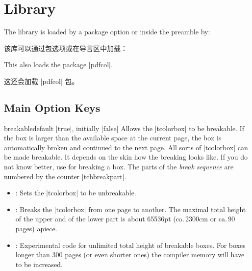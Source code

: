 \setcounter{section}{18}
\section{Library }\label{sec:breakable}%
%
The library is loaded by a package option or inside the preamble by:

该库可以通过包选项或在导言区中加载：
\begin{dispListing}
\end{dispListing}
This also loads the package |pdfcol|.

这还会加载 |pdfcol| 包。

% 




\clearpage
\subsection{Main Option Keys}
\begin{docTcbKey}[][doc updated=2017-02-01]{breakable}{}{default |true|, initially |false|}
  Allows the |tcolorbox| to be breakable. If the box is larger than the
  available space at the current page, the box is automatically broken
  and continued to the next page. All sorts of |tcolorbox| can be made
  breakable. It depends on the skin how the breaking looks like.
  If you do not know better, use  for breaking a box.
  The parts of the \emph{break sequence} are numbered
  by the counter |tcbbreakpart|.
  \begin{itemize}
  \item{}: Sets the |tcolorbox| to be unbreakable.
  \item{}: Breaks the |tcolorbox| from one page to another.
    The maximal total height of the upper and of the lower part is
    about 65536pt (ca.\,2300cm or ca.\,90 pages) apiece.
  \item{}: Experimental code for unlimited total height of
    breakable boxes.
    For boxes longer than 300 pages (or even shorter ones) the
    compiler memory will have to be increased.
  \end{itemize}

\begin{dispListing}

\begin{tcolorbox}[breakable,title=My breakable box]
\lipsum[1-6]
\end{tcolorbox}
\end{dispListing}
\end{docTcbKey}
{\tcbusetemp}


